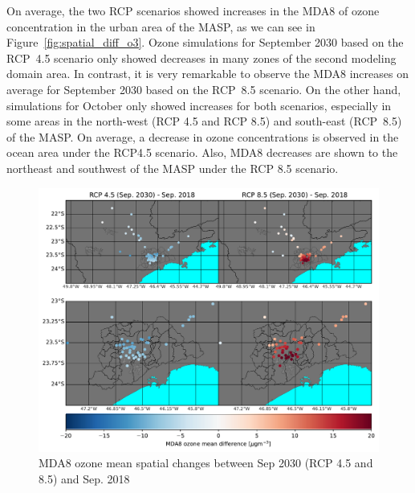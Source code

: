 On average, the two RCP scenarios showed increases in the MDA8 of ozone concentration in the urban area of the MASP, as we can see in Figure~\ref{fig:spatial_diff_o3}. Ozone simulations for September 2030 based on the RCP~4.5 scenario only showed decreases in many zones of the second modeling domain area. In contrast, it is very remarkable to observe the MDA8 increases on average for September 2030 based on the RCP~8.5 scenario. On the other hand, simulations for October only showed increases for both scenarios, especially in some areas in the north-west (RCP 4.5 and RCP 8.5) and south-east (RCP~8.5) of the MASP. On average, a decrease in ozone concentrations is observed in the ocean area under the RCP4.5 scenario. Also, MDA8 decreases are shown to the northeast and southwest of the MASP under the RCP 8.5 scenario.


\begin{figure}[hbt]
\begin{center}
	\includegraphics[width=1\textwidth]{fig/mda8_spatial_station_sep}
\end{center}
  \caption{MDA8 ozone mean spatial changes between Sep 2030 (RCP 4.5 and 8.5) and Sep. 2018}
  \label{fig:spatial_o3_sep}
\end{figure}

